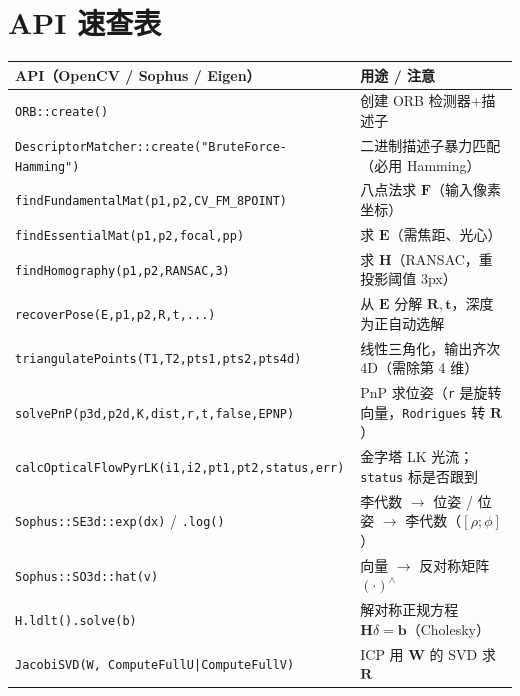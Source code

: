 \section*{API 速查表}
\begin{table}[H]\centering\small
\begin{tabular}{p{}p{}}
\toprule
API（OpenCV / Sophus / Eigen） & 用途 / 注意 \\
\midrule
\texttt{ORB::create()} & 创建 ORB 检测器+描述子 \\
\texttt{DescriptorMatcher::create("BruteForce-Hamming")} & 二进制描述子暴力匹配（必用 Hamming） \\
\texttt{findFundamentalMat(p1,p2,CV\_FM\_8POINT)} & 八点法求 $\mathbf{F}$（输入像素坐标） \\
\texttt{findEssentialMat(p1,p2,focal,pp)} & 求 $\mathbf{E}$（需焦距、光心） \\
\texttt{findHomography(p1,p2,RANSAC,3)} & 求 $\mathbf{H}$（RANSAC，重投影阈值 3px） \\
\texttt{recoverPose(E,p1,p2,R,t,...)} & 从 $\mathbf{E}$ 分解 $\mathbf{R},\mathbf{t}$，深度为正自动选解 \\
\texttt{triangulatePoints(T1,T2,pts1,pts2,pts4d)} & 线性三角化，输出齐次 4D（需除第 4 维） \\
\texttt{solvePnP(p3d,p2d,K,dist,r,t,false,EPNP)} & PnP 求位姿（\texttt{r} 是旋转向量，\texttt{Rodrigues} 转 $\mathbf{R}$） \\
\texttt{calcOpticalFlowPyrLK(i1,i2,pt1,pt2,status,err)} & 金字塔 LK 光流；\texttt{status} 标是否跟到 \\
\texttt{Sophus::SE3d::exp(dx)} / \texttt{.log()} & 李代数 $\to$ 位姿 / 位姿 $\to$ 李代数（$[\rho;\phi]$） \\
\texttt{Sophus::SO3d::hat(v)} & 向量 $\to$ 反对称矩阵 $(\cdot)^\wedge$ \\
\texttt{H.\allowbreak ldlt().\allowbreak solve(b)} & 解对称正规方程 $\mathbf{H}\delta=\mathbf{b}$（Cholesky） \\
\texttt{JacobiSVD(W, ComputeFullU|ComputeFullV)} & ICP 用 $\mathbf{W}$ 的 SVD 求 $\mathbf{R}$ \\
\bottomrule
\end{tabular}
\end{table}
